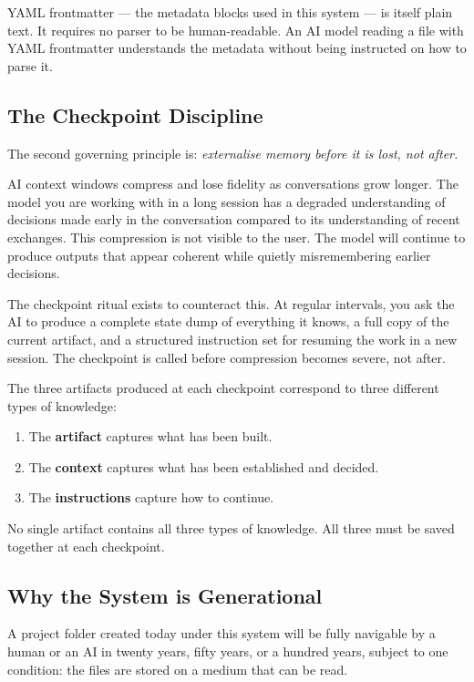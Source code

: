 \documentclass[12pt,letterpaper]{article}
\begin{document}
YAML frontmatter --- the metadata blocks used in this system --- is itself
plain text. It requires no parser to be human-readable. An AI model reading
a file with YAML frontmatter understands the metadata without being instructed
on how to parse it.

\subsection{The Checkpoint Discipline}

The second governing principle is: \textit{externalise memory before it is lost,
not after.}

AI context windows compress and lose fidelity as conversations grow longer.
The model you are working with in a long session has a degraded understanding
of decisions made early in the conversation compared to its understanding of
recent exchanges. This compression is not visible to the user. The model will
continue to produce outputs that appear coherent while quietly misremembering
earlier decisions.

The checkpoint ritual exists to counteract this. At regular intervals, you
ask the AI to produce a complete state dump of everything it knows, a full
copy of the current artifact, and a structured instruction set for resuming
the work in a new session. The checkpoint is called before compression becomes
severe, not after.

The three artifacts produced at each checkpoint correspond to three different
types of knowledge:

\begin{enumerate}
  \item The \textbf{artifact} captures what has been built.
  \item The \textbf{context} captures what has been established and decided.
  \item The \textbf{instructions} capture how to continue.
\end{enumerate}

No single artifact contains all three types of knowledge. All three must be
saved together at each checkpoint.

\subsection{Why the System is Generational}

A project folder created today under this system will be fully navigable by
a human or an AI in twenty years, fifty years, or a hundred years, subject
to one condition: the files are stored on a medium that can be read.
\end{document}
